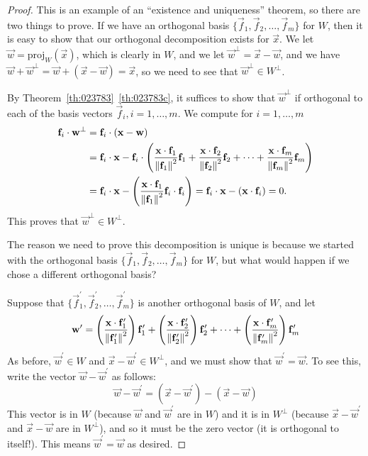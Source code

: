 \documentclass{ximera}
\begin{document}
\begin{proof}
This is an example of an ``existence and uniqueness'' theorem, so there are two things to prove.  If we have an orthogonal basis $\{\vec{f}_{1}, \vec{f}_{2}, \dots, \vec{f}_{m}\}$ for $W$, then it is easy to show that our orthogonal decomposition exists for $\vec{x}$. We let $\vec{w}=\mbox{proj}_W(\vec{x})$, which is clearly in $W$, and we let  $\vec{w}^\perp = \vec{x} - \vec{w}$, and we have $\vec{w} + \vec{w}^\perp = \vec{w} + (\vec{x} - \vec{w}) = \vec{x}$, so we need to see that $\vec{w}^\perp \in W^\perp$.

By Theorem~\ref{th:023783}~\ref{th:023783c}, it suffices to show that $\vec{w}^\perp$ if orthogonal to each of the basis vectors $\vec{f}_i, i=1,\ldots,m$.  We compute for $i=1,\ldots,m$
\begin{align*}
    \mathbf{f}_i \cdot \mathbf{w}^\perp 
    &= \mathbf{f}_i \cdot (\mathbf{x} - \mathbf{w}) \\
    &= \mathbf{f}_i \cdot \mathbf{x} -  \mathbf{f}_i \cdot  \left(\frac{\mathbf{x} \cdot \mathbf{f}_{1}}{\left\lVert\mathbf{f}_{1}\right\rVert^2}\mathbf{f}_{1} + \frac{\mathbf{x} \cdot \mathbf{f}_{2}}{\left\lVert\mathbf{f}_{2}\right\rVert^2}\mathbf{f}_{2}+ \dots +\frac{\mathbf{x} \cdot \mathbf{f}_{m}}{\left\lVert\mathbf{f}_{m}\right\rVert^2}\mathbf{f}_{m}\right) \\
    &= \mathbf{f}_i \cdot \mathbf{x} - \left(\frac{\mathbf{x} \cdot \mathbf{f}_{1}}{\left\lVert\mathbf{f}_{1}\right\rVert^2}\mathbf{f}_i \cdot\mathbf{f}_{i} \right) = \mathbf{f}_i \cdot \mathbf{x} - (\mathbf{x} \cdot \mathbf{f}_i) = 0.
\end{align*}
This proves that $\vec{w}^\perp \in W^\perp$.

The reason we need to prove this decomposition is unique is because we started with the orthogonal basis $\{\vec{f}_{1}, \vec{f}_{2}, \dots, \vec{f}_{m}\}$ for $W$, but what would happen if we chose a different orthogonal basis?  

Suppose that $\{\vec{f}_1^\prime, \vec{f}_2^\prime, \dots, \vec{f}_m^\prime \}$  is another orthogonal basis of $W$, and let
\begin{equation*}
\mathbf{w}^{\prime} = \left(\frac{\mathbf{x} \cdot \mathbf{f}^{\prime}_{1}}{\left\lVert\mathbf{f}^{\prime}_{1}\right\rVert^2}\right)\mathbf{f}^{\prime}_{1} + \left(\frac{\mathbf{x} \cdot \mathbf{f}^{\prime}_{2}}{\left\lVert\mathbf{f}^{\prime}_{2}\right\rVert^2}\right)\mathbf{f}^{\prime}_{2} + \dots +\left(\frac{\mathbf{x} \cdot \mathbf{f}^{\prime}_{m}}{\left\lVert\mathbf{f}^{\prime}_{m}\right\rVert^2}\right)\mathbf{f}^{\prime}_{m}
\end{equation*}
As before, $\vec{w}^{\prime} \in W$ and $\vec{x} - \vec{w}^{\prime} \in W^\perp$, and we must show that $\vec{w}^{\prime} = \vec{w}$. To see this, write the vector $\vec{w} - \vec{w}^\prime$ as follows:
\begin{equation*}
\vec{w} - \vec{w}^{\prime} = (\vec{x} - \vec{w}^{\prime}) - (\vec{x} - \vec{w})
\end{equation*}
This vector is in $W$ (because $\vec{w}$ and $\vec{w}^\prime$ are in $W$) and it is in $W^\perp$ (because $\vec{x} - \vec{w}^\prime$ and $\vec{x} - \vec{w}$ are in $W^\perp$), and so it must be the zero vector (it is orthogonal to itself!). This means $\vec{w}^\prime = \vec{w}$ as desired.
\end{proof}
\end{document}
